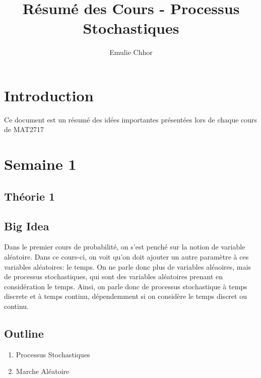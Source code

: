 \documentclass{article}
\begin{document}
\title{Résumé des Cours - Processus Stochastiques}
\author{Emulie Chhor}
\maketitle

\section*{Introduction}

Ce document est un résumé des idées importantes présentées lors de chaque cours
de MAT2717

\newtheorem{definition}{Definition}[subsection]
\newtheorem{theorem}{Theorem}[subsection]
\newtheorem{corollary}{Corollary}[subsection]
\newtheorem{lemma}[theorem]{Lemma}
\newtheorem{proposition}{Proposition}[section]
\newtheorem{axiom}{Axiome}
\newtheorem{property}{Propriété}[subsection]
\newtheorem*{remark}{Remarque}
\newtheorem*{problem}{Problème}
\newtheorem*{intuition}{Intuition}


\pagebreak
\section{Semaine 1}
\subsection{Théorie 1}

\subsection*{Big Idea}

Dans le premier cours de probabilité, on s'est penché sur la notion de variable
aléatoire. Dans ce cours-ci, on voit qu'on doit ajouter un autre paramètre à
ces variables aléatoires: le temps. On ne parle donc plus de variables aléaoires,
mais de processus stochastiques, qui sont des variables aléatoires prenant en
considération le temps. Ainsi, on parle donc de processus stochastique à temps
discrete et à temps continu, dépendemment si on considère le temps discret ou
continu.

\subsection*{Outline}
\begin{enumerate}
    \item Processus Stochastiques
    \item Marche Aléatoire
\end{enumerate}
\end{document}
